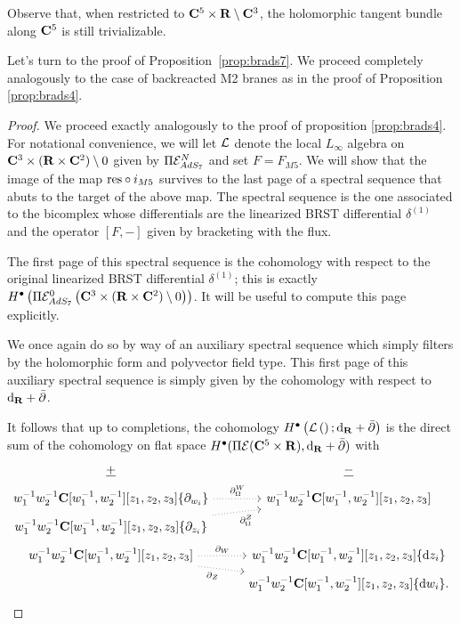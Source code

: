 \documentclass[../main.tex]{subfiles}
\begin{document}
Observe that, when restricted to $\mathbf{C}^5 \times \mathbf{R} \setminus \mathbf{C}^3$, the holomorphic tangent bundle along $\mathbf{C}^5$ is still trivializable. 

\parsec[]

Let's turn to the proof of Proposition~\ref{prop:brads7}.
We proceed completely analogously to the case of backreacted M2 branes as in the proof of Proposition \ref{prop:brads4}. 
\fi

\begin{proof}
We proceed exactly analogously to the proof of proposition \ref{prop:brads4}. For notational convenience, we will let $\mathcal{L}$ denote the local $L_\infty$ algebra on  $\mathbf{C}^3\times (\mathbf{R}\times \mathbf{C}^2)\setminus 0$ given by $\Pi\mathcal{E}^N_{AdS_7}$ and set $F = F_{M5}$. We will show that the image of the map $\mathrm{res}\circ i_{M5}$ survives to the last page of a spectral sequence that abuts to the target of the above map. The spectral sequence is the one associated to the bicomplex whose differentials are the linearized BRST differential $\delta^{(1)}$ and the operator $[F,- ]$ given by bracketing with the flux.

The first page of this spectral sequence is the cohomology with respect to the original linearized BRST differential $\delta^{(1)}$; this is exactly $H^\bullet \left ( \Pi \mathcal{E}^0 _{AdS_7} \left ( \mathbf{C}^3\times (\mathbf{R}\times \mathbf{C}^2)\setminus 0\right )\right )$. It will be useful to compute this page explicitly.

We once again do so by way of an auxiliary spectral sequence which simply filters by the holomorphic form and polyvector field type. 
This first page of this auxiliary spectral sequence is simply given by the cohomology with respect to $\mathrm{d}_{\mathbf{R}}+\bar{\partial}$. 

It follows that up to completions, the cohomology $H^\bullet \left ( \mathcal{L}\left ( \right ) ; \mathrm{d}_{\mathbf{R}} +\bar{\partial}\right )$  is the direct sum of the cohomology on flat space $H^\bullet(\Pi \mathcal{E}(\mathbf{C}^5 \times \mathbf{R}), \mathrm{d}_{\mathbf{R}}+\bar{\partial})$ with
\begin{equation}
  \label{eqn:ads7ss2} 
  \begin{tikzcd}[row sep = 1 ex]
    \ul{+} & \ul{-} \\ 
w_1^{-1} w_2^{-1} \C[w_1^{-1}, w_2^{-1}][z_1,z_2,z_3] \{\partial_{w_i}\}  \ar[r, dotted, "\div^W"] & w_1^{-1} w_2^{-1} \C[w_1^{-1}, w_2^{-1}] [z_1,z_2,z_3] \\
w_1^{-1} w_2^{-1} \C[w_1^{-1}, w_2^{-1}] [z_1,z_2,z_3] \{\del_{z_i}\} \ar[ur, dotted, "\div^Z"'] \\
w_1^{-1} w_2^{-1} \C[w_1^{-1}, w_2^{-1}] [z_1,z_2,z_3] \ar[r, dotted, "\del_W"] \ar[dr, dotted, "\del_Z"'] & w_1^{-1} w_2^{-1} \C[w_1^{-1}, w_2^{-1}][z_1,z_2,z_3] \{\d z_i\} \\ & w_1^{-1} w_2^{-1} \C[w_1^{-1}, w_2^{-1}][z_1,z_2,z_3] \{\d w_i\} .
\end{tikzcd}
\end{equation}


\end{proof}
\end{document}
